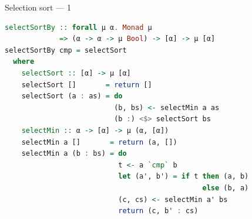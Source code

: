 \documentclass[handout]{beamer}
\begin{document}
\begin{frame}[fragile]{Selection sort --- 1}

\begin{lstlisting}[language=Haskell]
selectSortBy :: forall μ α. Monad μ
             => (α -> α -> μ Bool) -> [α] -> μ [α]
selectSortBy cmp = selectSort
  where
    selectSort :: [α] -> μ [α]
    selectSort []       = return []
    selectSort (a : as) = do
                          (b, bs) <- selectMin a as
                          (b :) <$> selectSort bs
    selectMin :: α -> [α] -> μ (α, [α])
    selectMin a []       = return (a, [])
    selectMin a (b : bs) = do
                           t <- a `cmp` b
                           let (a', b') = if t then (a, b)
                                               else (b, a)
                           (c, cs) <- selectMin a' bs
                           return (c, b' : cs)
\end{lstlisting}

\end{frame}
\end{document}
